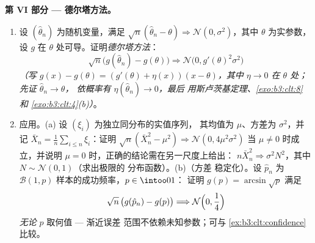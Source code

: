 \begin{problem}
\medskip
\noindent\textbf{第 VI 部分 --- 德尔塔方法。}
\begin{enumerate}[resume]
  \item 设 $(\hat\theta_n)$ 为随机变量，满足
        $\sqrt n(\hat\theta_n - \theta) \Rightarrow
        \mathcal N(0, \sigma^2)$，其中 $\theta$ 为实参数，
        设 $g$ 在
        $\theta$ 处可导。证明\emph{德尔塔方法}：
        \[
        \sqrt n\bigl(g(\hat\theta_n) - g(\theta)\bigr)
        \Longrightarrow \mathcal N\bigl(0,
        g'(\theta)^2\sigma^2\bigr)
        \]
        \emph{（写 $g(x) - g(\theta) = (g'(\theta) +
        \eta(x))(x - \theta)$，其中 $\eta \to 0$ 在
        $\theta$ 处；先证 $\hat\theta_n \to \theta$，
        依概率有 $\eta(\hat\theta_n) \to 0$，最后
        用斯卢茨基定理、\cref{exo:b3:clt:8} 和
        \cref{exo:b3:clt:4}(b)）}。
  \item 应用。(a) 设 $(\xi_i)$ 为独立同分布的实值序列，
        其均值为 $\mu$、方差为 $\sigma^2$，并记 $\bar X_n =
        \frac1n\sum_{i\leq n}\xi_i$：证明 $\sqrt n(\bar
        X_n^2 - \mu^2) \Rightarrow \mathcal N(0,
        4\mu^2\sigma^2)$ 当 $\mu \neq 0$ 时成立，并说明
        $\mu = 0$ 时，正确的结论需在另一尺度上给出：
        $n\bar X_n^2 \Rightarrow \sigma^2N^2$，其中
        $N \sim \mathcal N(0,1)$（求出极限的
        分布函数）。(b)（方差
        稳定化）。设 $\hat p_n$ 为
        $\mathcal B(1, p)$ 样本的成功频率，$p \in \intoo01$：
        证明 $g(p) = \arcsin\sqrt p$ 满足
        \[
        \sqrt n\,\bigl(g(\hat p_n) - g(p)\bigr)
        \Longrightarrow \mathcal N\Bigl(0, \frac14\Bigr)
        \]
        \emph{无论} $p$ 取何值 --- 渐近误差
        范围不依赖未知参数；可与
        \cref{ex:b3:clt:confidence} 比较。
\end{enumerate}


\end{problem}
